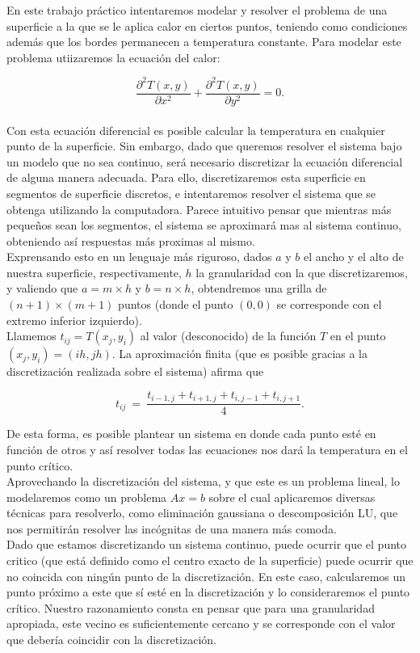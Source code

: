 En este trabajo práctico intentaremos modelar y resolver el problema de una superficie a la que se le aplica calor en ciertos puntos, teniendo como condiciones además que los bordes permanecen a temperatura constante. Para modelar este problema utiizaremos la ecuación del calor:

\begin{equation}
\frac{\partial^2T(x,y)}{\partial x^{2}}+\frac{\partial^2 T(x,y)}{\partial y^{2}} = 0.
\end{equation}\\

Con esta ecuación diferencial es posible calcular la temperatura en cualquier punto de la superficie. Sin embargo, dado que queremos resolver el sistema bajo un modelo que no sea continuo, será necesario discretizar la ecuación diferencial de alguna manera adecuada. Para ello, discretizaremos esta superficie en segmentos de superficie discretos, e intentaremos resolver el sistema que se obtenga utilizando la computadora. Parece intuitivo pensar que mientras más pequeños sean los segmentos, el sistema se aproximará mas al sistema continuo, obteniendo así respuestas más proximas al mismo.
\\
Exprensando esto en un lenguaje más riguroso, dados $a$ y $b$ el ancho y el alto de nuestra superficie, respectivamente, $h$ la granularidad con la que discretizaremos, y valiendo que  $a = m\times h$ y $b = n \times h$, obtendremos una grilla de $(n+1)\times(m+1)$ puntos (donde el punto $(0,0)$ se corresponde con el extremo inferior izquierdo).
\\
Llamemos $t_{ij} = T(x_j,y_i)$ al valor (desconocido) de la función $T$ en el punto $(x_j, y_i) = (ih, jh)$. La aproximación finita (que es posible gracias a la discretización realizada sobre el sistema) afirma que

\begin{equation}
t_{ij} \ =\ \frac{ t_{i-1,j} + t_{i+1,j} + t_{i,j-1} + t_{i,j+1}}{4}.
\end{equation}

De esta forma, es posible plantear un sistema en donde cada punto esté en función de otros y así resolver todas las ecuaciones nos dará la temperatura en el punto crítico.
\\
Aprovechando la discretización del sistema, y que este es un problema lineal, lo modelaremos como un problema $Ax=b$ sobre el cual aplicaremos diversas técnicas para resolverlo, como eliminación gaussiana o descomposición LU, que nos permitirán resolver las incógnitas de una manera más comoda.
\\
Dado que estamos discretizando un sistema continuo, puede ocurrir que el punto critico (que está definido como el centro exacto de la superficie) puede ocurrir que no coincida con ningún punto de la discretización. En este caso, calcularemos un punto próximo a este que sí esté en la discretización y lo consideraremos el punto crítico. Nuestro razonamiento consta en pensar que para una granularidad apropiada, este vecino es suficientemente cercano y se corresponde con el valor que debería coincidir con la discretización.

